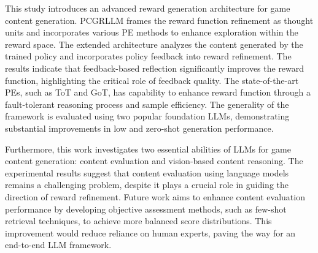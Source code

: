 
This study introduces an advanced reward generation architecture for game content generation. PCGRLLM frames the reward function refinement as thought units and incorporates various PE methods to enhance exploration within the reward space.
The extended architecture analyzes the content generated by the trained policy and incorporates policy feedback into reward refinement. The results indicate that feedback-based reflection significantly improves the reward function, highlighting the critical role of feedback quality.
The state-of-the-art PEs, such as ToT and GoT, has capability to enhance reward function through a fault-tolerant reasoning process and sample efficiency.
The generality of the framework is evaluated using two popular foundation LLMs, demonstrating substantial improvements in low and zero-shot generation performance.

Furthermore, this work investigates two essential abilities of LLMs for game content generation: content evaluation and vision-based content reasoning. The experimental results suggest that content evaluation using language models remains a challenging problem, despite it plays a crucial role in guiding the direction of reward refinement.
Future work aims to enhance content evaluation performance by developing objective assessment methods, such as few-shot retrieval techniques, to achieve more balanced score distributions. This improvement would reduce reliance on human experts, paving the way for an end-to-end LLM framework.